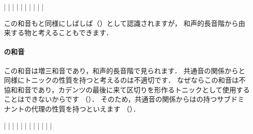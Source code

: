 \documentclass[dvipdfmx,uplatex,b5paper,openany,jbase=12Q,nomag*,textwidth-limit=44%
               ]{gachimuchi}
\begin{document}
\begin{floatMusic}[pos=ht]
  \Startpiece%
  \znotes|\en
  \NOTes
  |%
  \en\bar
  \NOTEs
  |%
  \en\doublebar
  \NOTEs
  |%
  \en\bar
  \NOTEs
  |%
  \en\doublebar
  \NOTes
  \zchordsl{\Mdline}\sk%
  |%
  \en\bar
  \NOTes
  \Mryaku\sk%
  |%
  \Mryaku\sk
  \en\setdoublebar
  \endpiece%
\end{floatMusic}

この和音も\Gnii\Dimt と同様にしばしば（）として認識されますが，
和声的長音階から由来する物と考えることもできます．

\paragraph{\bFlat\Gnvi\Aug の和音}
この和音は増三和音であり，和声的長音階で見られます．
共通音の関係から\Gni と同様にトニックの性質を持つと考えるのは不適切です．
なぜならこの和音は不協和和音であり，カデンツの最後に来て区切りを形作るトニックとして使用することはできないからです
（）．
そのため，共通音の関係からは\Gniv\Min の持つサブドミナントの代理の性質を持つといえます
（）．

\begin{floatMusic}[pos=ht]
  \Startpiece%
  \znotes|\en
  \znotes|\en
  \NOTes
  |%
  \en\bar
  \NOTes
  |%
  \en\doublebar
  \NOTes
  \Mryaku\sk|\Mryaku\sk
  \en\bar
  \NOTes
  |%
  \en\doublebar
  \znotes|\en
  \NOTEs
  |%
  \en\bar
  \NOTEs
  |%
  \en\setdoublebar
  \endpiece%
\end{floatMusic}
\end{document}
